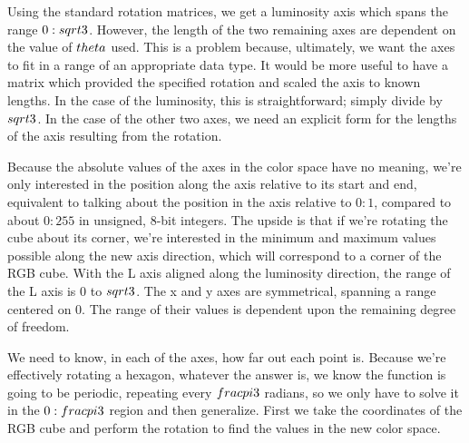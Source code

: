 Using the standard rotation matrices, we get a luminosity axis which spans the range $0:\\sqrt{3}$. However, the length of the two remaining axes are dependent on the value of $\\theta$ used. This is a problem because, ultimately, we want the axes to fit in a range of an appropriate data type. It would be more useful to have a matrix which provided the specified rotation and scaled the axis to known lengths. In the case of the luminosity, this is straightforward; simply divide by $\\sqrt{3}$. In the case of the other two axes, we need an explicit form for the lengths of the axis resulting from the rotation.

Because the absolute values of the axes in the color space have no meaning, we're only interested in the position along the axis relative to its start and end, equivalent to talking about the position in the axis relative to $0:1$, compared to about $0:255$ in unsigned, 8-bit integers. The upside is that if we're rotating the cube about its corner, we're interested in the minimum and maximum values possible along the new axis direction, which will correspond to a corner of the RGB cube. With the L axis aligned along the luminosity direction, the range of the L axis is 0 to $\\sqrt{3}$. The x and y axes are symmetrical, spanning a range centered on 0. The range of their values is dependent upon the remaining degree of freedom.

We need to know, in each of the axes, how far out each point is. Because we're effectively rotating a hexagon, whatever the answer is, we know the function is going to be periodic, repeating every $\\frac{\\pi}{3}$ radians, so we only have to solve it in the $0:\\frac{\\pi}{3}$ region and then generalize. First we take the coordinates of the RGB cube and perform the rotation to find the values in the new color space.



